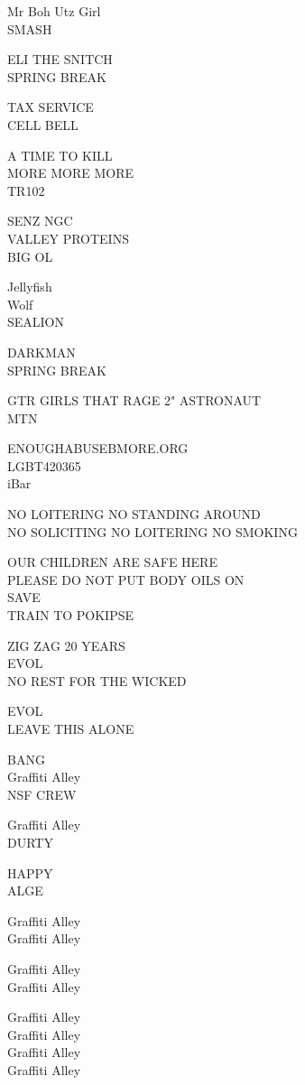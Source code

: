 \documentclass[10pt,letterpaper]{article}
\begin{document}
Mr Boh Utz Girl\\
SMASH

ELI THE SNITCH\\
SPRING BREAK

TAX SERVICE\\
CELL BELL

A TIME TO KILL\\
MORE MORE MORE\\
TR102

SENZ NGC\\
VALLEY PROTEINS\\
BIG OL

Jellyfish\\
Wolf\\
SEALION

DARKMAN\\
SPRING BREAK

GTR GIRLS THAT RAGE 2" ASTRONAUT\\
MTN

ENOUGHABUSEBMORE.ORG\\
LGBT420365\\
iBar

NO LOITERING NO STANDING AROUND\\
NO SOLICITING NO LOITERING NO SMOKING

OUR CHILDREN ARE SAFE HERE\\
PLEASE DO NOT PUT BODY OILS ON\\
SAVE\\
TRAIN TO POKIPSE

ZIG ZAG 20 YEARS\\
EVOL\\
NO REST FOR THE WICKED

EVOL\\
LEAVE THIS ALONE

BANG\\
Graffiti Alley\\
NSF CREW

Graffiti Alley\\
DURTY

HAPPY\\
ALGE

Graffiti Alley\\
Graffiti Alley

Graffiti Alley\\
Graffiti Alley

Graffiti Alley\\
Graffiti Alley\\
Graffiti Alley\\
Graffiti Alley
\end{document}
